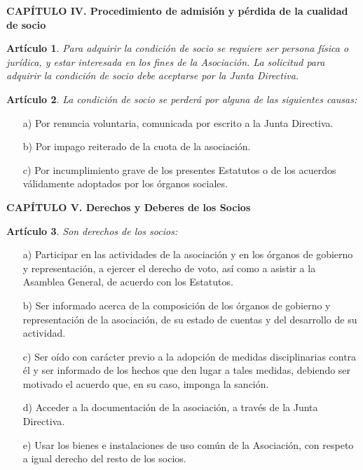 \documentclass[a4paper,12pt]{article}
\theoremstyle{mystyle}		%
\newtheorem{art}{Artículo}	%
\begin{document}
\begin{onehalfspace}
\bigskip

\begin{center}
\textbf{CAPÍTULO IV. Procedimiento de admisión y pérdida de la cualidad de socio}
\end{center}

\begin{art}
Para adquirir la condición de socio se requiere ser persona física o jurídica, y estar interesada en los fines de la Asociación. La solicitud para adquirir la condición de socio debe aceptarse por la Junta Directiva.
\end{art}

\begin{art}
La condición de socio se perderá por alguna de las siguientes causas:
\end{art}
\begin{itemize}
\item [a)] Por renuncia voluntaria, comunicada por escrito a la Junta Directiva.
\item [b)] Por impago reiterado de la cuota de la asociación.
\item [c)] Por incumplimiento grave de los presentes Estatutos o de los acuerdos válidamente adoptados por los órganos sociales.
\end{itemize}

\bigskip
\newpage
\begin{center}
\textbf{CAPÍTULO V. Derechos y Deberes de los Socios}
\end{center}

\begin{art}
Son derechos de los socios:
\end{art}
\begin{itemize}
\item [a)] Participar en las actividades de la asociación y en los órganos de gobierno y representación, a ejercer el derecho de voto, así como a asistir a la Asamblea General, de acuerdo con los Estatutos.
\item [b)] Ser informado acerca de la composición de los órganos de gobierno y representación de la asociación, de su estado de cuentas y del desarrollo de su actividad.
\item [c)] Ser oído con carácter previo a la adopción de medidas disciplinarias contra él y ser informado de los hechos que den lugar a tales medidas, debiendo ser motivado el acuerdo que, en su caso, imponga la sanción.
\item [d)] Acceder a la documentación de la asociación, a través de la Junta Directiva.
\item [e)] Usar los bienes e instalaciones de uso común de la Asociación, con respeto a igual derecho del resto de los socios.
\end{itemize}


\end{onehalfspace}
\end{document}

